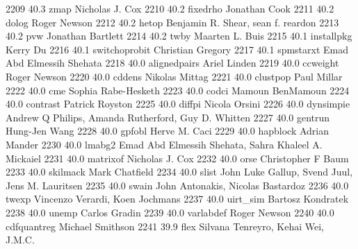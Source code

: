   2209     40.3    zmap          Nicholas J. Cox                         
  2210     40.2    fixedrho      Jonathan Cook                           
  2211     40.2    dolog         Roger Newson                            
  2212     40.2    hetop         Benjamin R. Shear, sean f. reardon      
  2213     40.2    pvw           Jonathan Bartlett                       
  2214     40.2    twby          Maarten L. Buis                         
  2215     40.1    installpkg    Kerry Du                                
  2216     40.1    switchoprobit  Christian Gregory                       
  2217     40.1    spmstarxt     Emad Abd Elmessih Shehata               
  2218     40.0    alignedpairs  Ariel Linden                            
  2219     40.0    ccweight      Roger Newson                            
  2220     40.0    cddens        Nikolas Mittag                          
  2221     40.0    clustpop      Paul Millar                             
  2222     40.0    cme           Sophia Rabe-Hesketh                     
  2223     40.0    codci         Mamoun BenMamoun                        
  2224     40.0    contrast      Patrick Royston                         
  2225     40.0    diffpi        Nicola Orsini                           
  2226     40.0    dynsimpie     Andrew Q Philips, Amanda Rutherford,    
                                   Guy D. Whitten                          
  2227     40.0    gentrun       Hung-Jen Wang                           
  2228     40.0    gpfobl        Herve M. Caci                           
  2229     40.0    hapblock      Adrian Mander                           
  2230     40.0    lmabg2        Emad Abd Elmessih Shehata, Sahra        
                                   Khaleel A. Mickaiel                     
  2231     40.0    matrixof      Nicholas J. Cox                         
  2232     40.0    orse          Christopher F Baum                      
  2233     40.0    skilmack      Mark Chatfield                          
  2234     40.0    slist         John Luke Gallup, Svend Juul, Jens M.   
                                   Lauritsen                               
  2235     40.0    swain         John Antonakis, Nicolas Bastardoz       
  2236     40.0    twexp         Vincenzo Verardi, Koen Jochmans         
  2237     40.0    uirt_sim      Bartosz Kondratek                       
  2238     40.0    unemp         Carlos Gradin                           
  2239     40.0    varlabdef     Roger Newson                            
  2240     40.0    cdfquantreg   Michael Smithson                        
  2241     39.9    flex          Silvana Tenreyro, Kehai Wei, J.M.C.     
